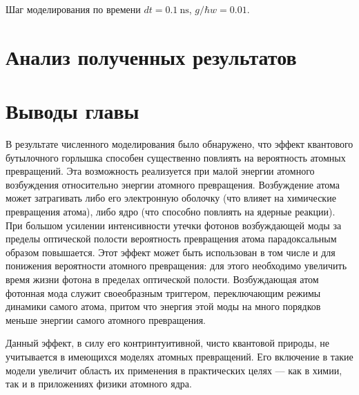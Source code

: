 Шаг моделирования по времени $dt = 0.1~\text{ns}$, $g/\hbar w = 0.01$.


\clearpage
\section{Анализ полученных результатов}

\clearpage
\section{Выводы главы}\label{sec:ch2/sec4}

В результате численного моделирования было обнаружено, что эффект квантового бутылочного горлышка способен существенно повлиять на вероят­ность атомных превращений. Эта возможность реализуется при малой энергии атомного возбуждения относительно энергии атомного превращения. Возбуж­дение атома может затрагивать либо его электронную оболочку (что влияет на химические превращения атома), либо ядро (что способно повлиять на ядерные реакции). При большом усилении интенсивности утечки фотонов возбужда­ющей моды за пределы оптической полости вероятность превращения атома парадоксальным образом повышается. Этот эффект может быть использован в том числе и для понижения вероятности атомного превращения: для этого необходимо увеличить время жизни фотона в пределах оптической полости. Возбуждающая атом фотонная мода служит своеобразным триггером, пере­ключающим режимы динамики самого атома, притом что энергия этой моды на много порядков меньше энергии самого атомного превращения.

Данный эффект, в силу его контринтуитивной, чисто квантовой природы, не учитывается в имеющихся моделях атомных превращений. Его включение в такие модели увеличит область их применения в практических целях --- как в химии, так и в приложениях физики атомного ядра.
